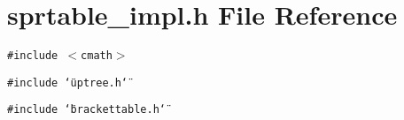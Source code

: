 \section{sprtable\_\-impl.h File Reference}
\label{sprtable__impl_8h}
{\tt \#include $<$cmath$>$}\par
{\tt \#include \char`\"{}uptree.h\char`\"{}}\par
{\tt \#include \char`\"{}brackettable.h\char`\"{}}\par
